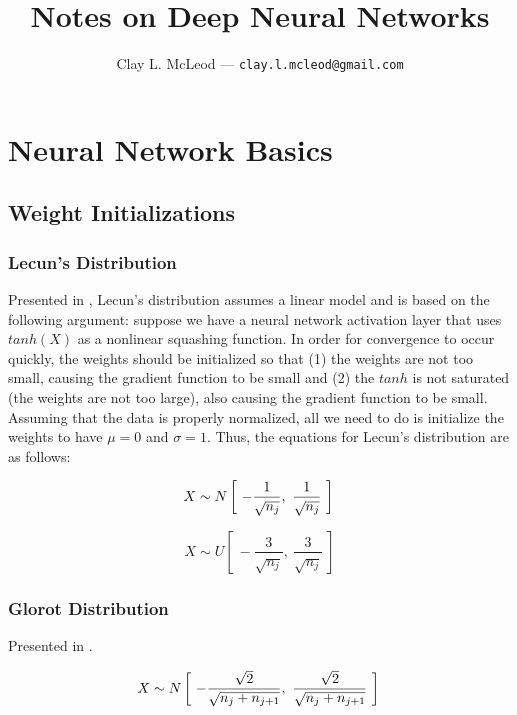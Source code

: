 \documentclass[12pt]{article}
\title{Notes on Deep Neural Networks}
\author{Clay L. McLeod --- \texttt{clay.l.mcleod@gmail.com}}
\begin{document}
\maketitle

\section{Neural Network Basics}
\subsection{Weight Initializations}

\subsubsection{Lecun's Distribution}

Presented in \cite[Sec 4.6]{efficient-backprop}, Lecun's distribution assumes a linear model and is based on the following argument: suppose we have a neural network activation layer that uses $tanh(X)$ as a nonlinear squashing function. In order for convergence to occur quickly, the weights should be initialized so that (1) the weights are not too small, causing the gradient function to be small and (2) the $tanh$ is not saturated (the weights are not too large), also causing
the gradient function to be small. Assuming that the data is properly normalized, all we need to do is initialize the weights to have $\mu=0$ and $\sigma=1$. Thus, the equations for Lecun's distribution are as follows:

\begin{equation}
    X \sim N \left[~-\frac{1}{\sqrt{n_{j}}},~\frac{1}{\sqrt{n_{j}}}~\right]\\
    \label{eq:lecun:normal}
\end{equation}


\begin{equation}
    X \sim U \left[~-\frac{3}{\sqrt{n_{j}}},~\frac{3}{\sqrt{n_{j}}}~\right]
    \label{eq:lecun:uniform}
\end{equation}

\subsubsection{Glorot Distribution}

Presented in \cite[4.2]{glorot10}.

\begin{equation}
    X \sim N \left[~-\frac{\sqrt{2}}{\sqrt{n_{j} + n_{j+1}}},~\frac{\sqrt{2}}{\sqrt{n_{j} + n_{j+1}}}~\right]\\
    \label{eq:glorot:normal}
\end{equation}
\end{document}
